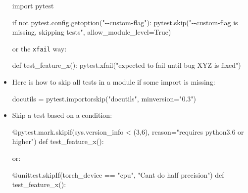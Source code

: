 \documentclass[
]{report}
\newenvironment{Shaded}{\begin{snugshade}}{\end{snugshade}}
\newcommand{\AttributeTok}[1]{\textcolor[rgb]{0.40,0.45,0.13}{#1}}
\newcommand{\ControlFlowTok}[1]{\textcolor[rgb]{0.00,0.23,0.31}{#1}}
\newcommand{\DecValTok}[1]{\textcolor[rgb]{0.68,0.00,0.00}{#1}}
\newcommand{\ImportTok}[1]{\textcolor[rgb]{0.00,0.46,0.62}{#1}}
\newcommand{\KeywordTok}[1]{\textcolor[rgb]{0.00,0.23,0.31}{#1}}
\newcommand{\NormalTok}[1]{\textcolor[rgb]{0.00,0.23,0.31}{#1}}
\newcommand{\OperatorTok}[1]{\textcolor[rgb]{0.37,0.37,0.37}{#1}}
\newcommand{\StringTok}[1]{\textcolor[rgb]{0.13,0.47,0.30}{#1}}
\newcommand{\VariableTok}[1]{\textcolor[rgb]{0.07,0.07,0.07}{#1}}
\begin{document}
\begin{itemize}
\begin{Shaded}
\begin{Highlighting}[]
\ImportTok{import}\NormalTok{ pytest}

\ControlFlowTok{if} \KeywordTok{not}\NormalTok{ pytest.config.getoption(}\StringTok{"{-}{-}custom{-}flag"}\NormalTok{):}
\NormalTok{    pytest.skip(}\StringTok{"{-}{-}custom{-}flag is missing, skipping tests"}\NormalTok{, allow\_module\_level}\OperatorTok{=}\VariableTok{True}\NormalTok{)}
\end{Highlighting}
\end{Shaded}

  or the \texttt{xfail} way:

\begin{Shaded}
\begin{Highlighting}[]
\KeywordTok{def}\NormalTok{ test\_feature\_x():}
\NormalTok{    pytest.xfail(}\StringTok{"expected to fail until bug XYZ is fixed"}\NormalTok{)}
\end{Highlighting}
\end{Shaded}
\item
  Here is how to skip all tests in a module if some import is missing:

\begin{Shaded}
\begin{Highlighting}[]
\NormalTok{docutils }\OperatorTok{=}\NormalTok{ pytest.importorskip(}\StringTok{"docutils"}\NormalTok{, minversion}\OperatorTok{=}\StringTok{"0.3"}\NormalTok{)}
\end{Highlighting}
\end{Shaded}
\item
  Skip a test based on a condition:

\begin{Shaded}
\begin{Highlighting}[]
\AttributeTok{@pytest.mark.skipif}\NormalTok{(sys.version\_info }\OperatorTok{\textless{}}\NormalTok{ (}\DecValTok{3}\NormalTok{,}\DecValTok{6}\NormalTok{), reason}\OperatorTok{=}\StringTok{"requires python3.6 or higher"}\NormalTok{)}
\KeywordTok{def}\NormalTok{ test\_feature\_x():}
\end{Highlighting}
\end{Shaded}

  or:

\begin{Shaded}
\begin{Highlighting}[]
\AttributeTok{@unittest.skipIf}\NormalTok{(torch\_device }\OperatorTok{==} \StringTok{"cpu"}\NormalTok{, }\StringTok{"Can\textquotesingle{}t do half precision"}\NormalTok{)}
\KeywordTok{def}\NormalTok{ test\_feature\_x():}
\end{Highlighting}
\end{Shaded}


\end{itemize}
\end{document}
